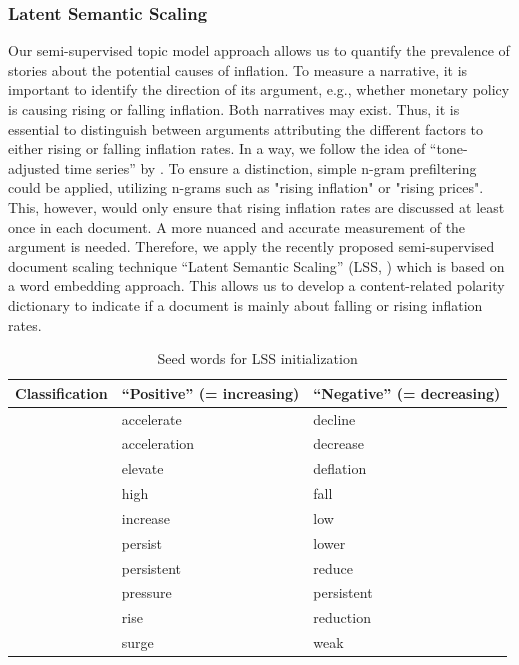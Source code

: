 \subsubsection{Latent Semantic Scaling}

Our semi-supervised topic model approach allows us to quantify the prevalence of stories about the potential causes of inflation. To measure a narrative, it is important to identify the direction of its argument, e.g., whether monetary policy is causing rising or falling inflation. Both narratives may exist. Thus, it is essential to distinguish between arguments attributing the different factors to either rising or falling inflation rates. In a way, we follow the idea of ``tone-adjusted time series'' by \citep{Larsen.2019}. To ensure a distinction, simple n-gram prefiltering could be applied, utilizing n-grams such as "rising inflation" or "rising prices". This, however, would only ensure that rising inflation rates are discussed at least once in each document. A more nuanced and accurate measurement of the argument is needed. Therefore, we apply the recently proposed semi-supervised document scaling technique ``Latent Semantic Scaling'' (\textsf{LSS},  \cite{Watanabe.2021}) which is based on a word embedding approach. This allows us to develop a content-related polarity dictionary to indicate if a document is mainly about falling or rising inflation rates. 

\begin{table}[H]
	\centering
	\begin{tabular}{l|l|l}
		\toprule
		Classification 	& ``Positive'' (= increasing) 		& ``Negative'' (= decreasing)\\
		\midrule
						& accelerate 	& decline  \\
						& acceleration  & decrease \\
						& elevate 		& deflation \\
						& high			& fall \\
						& increase		& low \\
						& persist		& lower\\
						& persistent	& reduce\\
						& pressure		& persistent\\
						& rise			& reduction\\
						& surge			& weak\\
		\bottomrule
	\end{tabular}
	\caption{Seed words for LSS initialization}\label{table:seed_words}
\end{table}

